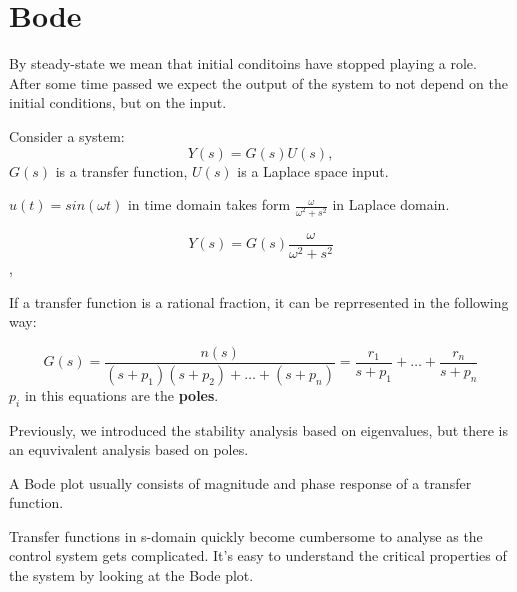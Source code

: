 \section{Bode}

By steady-state we mean that initial conditoins have stopped playing a role.
After some time passed we expect the output of the system to not depend on the initial conditions, but on the input. 

Consider a system:
\[Y(s) = G(s)U(s),\]
$G(s)$ is a transfer function, $U(s)$ is a Laplace space input. 

$u(t) = sin(\omega t)$ in time domain takes form $\frac{\omega}{\omega^2 + s^2}$ in  Laplace domain.

\[Y(s) = G(s) \frac{\omega}{\omega^2 + s^2}\], 

If a transfer function is a rational fraction, it can be reprresented in the following way:

\[G(s) = \dfrac{n(s)}{(s+p_1)(s+p_2) + \dots + (s+p_n)} = \dfrac{r_1}{s+p_1} + \dots + \dfrac{r_n}{s+p_n}\]
$p_i$ in this equations are the \textbf{poles}. 

Previously, we introduced the stability analysis based on eigenvalues, but there is an equvivalent analysis based on poles. 


A Bode plot usually consists of magnitude and phase response of a transfer function.

Transfer functions in s-domain quickly become cumbersome to analyse as the control system gets complicated. It’s easy to understand the critical properties of the system by looking at the Bode plot.








